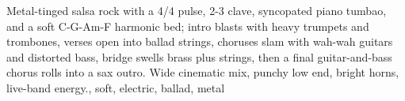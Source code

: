 
\begin{notes}
\end{notes}
\begin{prompt}
Metal-tinged salsa rock with a 4/4 pulse, 2-3 clave, syncopated piano tumbao, and a soft C-G-Am-F harmonic bed; intro blasts with heavy trumpets and trombones, verses open into ballad strings, choruses slam with wah-wah guitars and distorted bass, bridge swells brass plus strings, then a final guitar-and-bass chorus rolls into a sax outro. Wide cinematic mix, punchy low end, bright horns, live-band energy., soft, electric, ballad, metal
\end{prompt}

